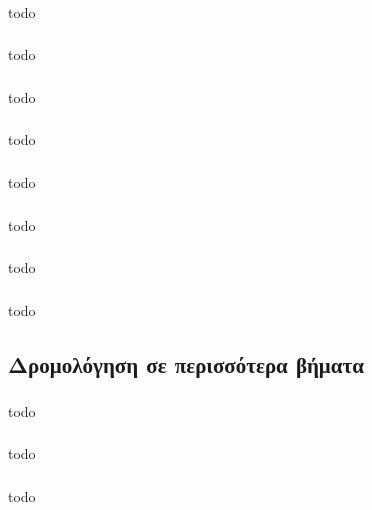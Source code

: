 \documentclass[a4paper, 12pt]{article}
\begin{document}
		\subsubsection{}
			todo

		\subsubsection{}
			todo

		\subsubsection{}
			todo

		\subsubsection{}
			todo

		\subsubsection{}
			todo

		\subsubsection{}
			todo

		\subsubsection{}
			todo

		\subsubsection{}
			todo

	\subsection{Δρομολόγηση σε περισσότερα βήματα}

		\subsubsection{}
			todo

		\subsubsection{}
			todo

		\subsubsection{}
			todo
\end{document}
